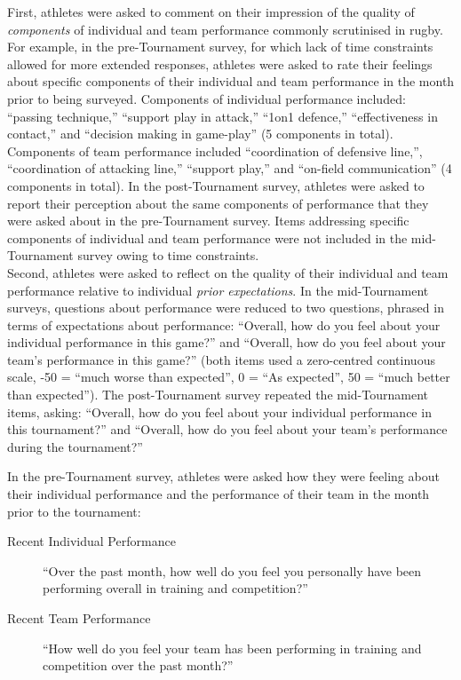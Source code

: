 \documentclass[12pt]{report}
\begin{document}
First, athletes were asked to comment on their impression of the quality of \textit{components} of individual and team performance commonly scrutinised in rugby. For example, in the pre-Tournament survey, for which lack of time constraints allowed for more extended responses, athletes were asked to rate their feelings about specific components of their individual and team performance in the month prior to being surveyed. Components of individual performance included:   ``passing technique,''  ``support play in attack,''  ``1on1 defence,''  ``effectiveness in contact,'' and  ``decision making in game-play'' (5 components in total).  Components of team performance included ``coordination of defensive line,'',  ``coordination of attacking line,''  ``support play,'' and  ``on-field communication'' (4 components in total). In the post-Tournament survey, athletes were asked to report their perception about the same components of performance that they were asked about in the pre-Tournament survey. Items addressing specific components of individual and team performance were not included in the mid-Tournament survey owing to time constraints. \\

Second, athletes were asked to reflect on the quality of their individual and team performance relative to individual \textit{prior expectations}.  In the mid-Tournament surveys, questions about performance were reduced to two questions, phrased in terms of expectations about performance: ``Overall, how do you feel about your individual performance in this game?'' and ``Overall, how do you feel about your team's performance in this game?'' (both items used a zero-centred continuous scale, -50 = ``much worse than expected'', 0 =  ``As expected'', 50 =  ``much better than expected''). The post-Tournament survey repeated the mid-Tournament items, asking:  ``Overall, how do you feel about your individual performance in this tournament?'' and  ``Overall, how do you feel about your team's performance during the tournament?''

In the pre-Tournament survey, athletes were asked how they were feeling about their individual performance and the performance of their team in the month prior to the tournament:

\begin{description}
\item[Recent Individual Performance] ``Over the past month, how well do you feel you personally have been performing overall in training and competition?''
\item [Recent Team Performance] ``How well do you feel your team has been performing in training and competition over the past month?''
\end{description}
\end{document}
